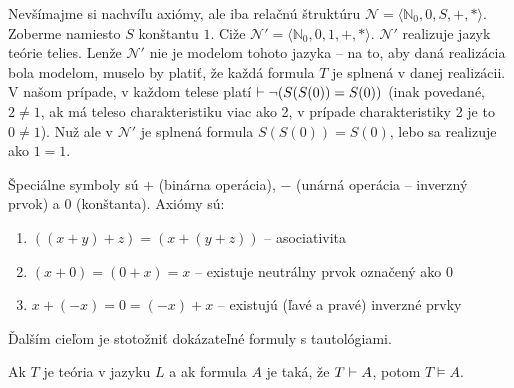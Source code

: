 \begin{poznamka}
    Nevšímajme si nachvíľu axiómy, ale iba relačnú štruktúru
    $\mathcal{N}=\langle \mathbb{N}_0,0,S,+,* \rangle$.
    Zoberme namiesto $S$ konštantu $1$.
    Ciže $\mathcal{N}'=\langle \mathbb{N}_0,0,1,+,* \rangle$.
    $\mathcal{N}'$ realizuje jazyk teórie telies.
    Lenže $\mathcal{N}'$ nie je modelom tohoto jazyka --
    na to, aby daná realizácia bola modelom, muselo by platiť, že
    každá formula $T$ je splnená v danej realizácii. V našom prípade,
    v každom telese platí $\vdash \neg (S(S(0))=S(0))$ (inak
    povedané, $2 \ne 1$, ak má teleso charakteristiku viac ako 2,
    v prípade charakteristiky 2 je to $0 \ne 1$). Nuž ale v 
    $\mathcal{N}'$ je splnená formula $S(S(0))=S(0)$, lebo sa
    realizuje ako $1=1$.
\end{poznamka}

\begin{priklad}
    Špeciálne symboly sú $+$ (binárna operácia), $-$ (unárná operácia
    -- inverzný prvok) a $0$ (konštanta).
    Axiómy sú:
    \begin{enumerate}
            \item $((x+y)+z) = (x+(y+z))$ -- asociativita
            \item $(x+0) = (0+x) = x$ -- existuje neutrálny prvok
            označený ako 0
            \item $x+(-x) = 0 = (-x)+x$ -- existujú (ľavé a pravé) inverzné
            prvky
    \end{enumerate}
\end{priklad}

Ďalším cieľom je stotožniť dokázateľné formuly s tautológiami.

\begin{veta}[O korektnosti]
    Ak $T$ je teória v jazyku $L$ a ak formula $A$ je taká,
    že $T \vdash A$, potom $T \models A$.
\end{veta}

